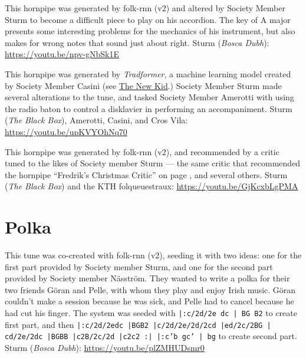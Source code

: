 \documentclass[a4paper,notitlepage,twoside]{book}
\begin{document}
\clearpage
{}
{}  
  
\hypertarget{hornpipe:DogintheBog}{}
This hornpipe was generated by folk-rnn (v2) and
altered by Society Member Sturm to become a difficult piece to play
on his accordion.
The key of A major presents some interesting problems for the mechanics
of his instrument, but also makes for wrong notes that sound just about right.
Sturm ({\em Bosca Dubh}): \url{https://youtu.be/npv-gNbSk1E}

\clearpage
{}
{}  
  
\hypertarget{hornpipe:RadioBatonHornpipe}{}
This hornpipe was generated by {\em Tradformer}, 
a machine learning model created by Society Member Casini
(see \hyperlink{jig:NewKid}{The New Kid}.)
Society Member Sturm made several alterations to the tune,
and tasked Society Member Amerotti with using the radio baton
to control a disklavier in performing an accompaniment.
Sturm ({\em The Black Box}), Amerotti, Casini, and Cros Vila: \url{https://youtu.be/upKVYOhNq70}

{}  
  
\hypertarget{hornpipe:TidforJul}{}
This hornpipe was generated by folk-rnn (v2), 
and recommended by a critic tuned to the likes of 
Society member Sturm --- the same critic that recommended
the hornpipe ``Fredrik's Christmas Critic'' on page \pageref{hornpipe:FredriksChristmasCritic},
and several others.
Sturm ({\em The Black Box}) and the KTH folqueuestraux: \url{https://youtu.be/GjKcxbLgPMA}



\clearpage
\section{Polka}
{}  
 
\hypertarget{polka:GoranPelle}{}
This tune was co-created with folk-rnn (v2), seeding it with two ideas: 
one for the first part provided by Society member Sturm, 
and one for the second part provided by Society member Näsström. 
They wanted to write a polka for their two friends Göran and Pelle, 
with whom they play and enjoy Irish music. 
Göran couldn't make a session because he was sick, 
and Pelle had to cancel because he had cut his finger.
The system was seeded with {\tt |:c/2d/2e dc | BG B2} to create first part,
and then 
{\tt |:c/2d/2edc |BGB2 |c/2d/2e/2d/2cd |ed/2c/2BG | cd/2e/2dc |BGBB |c2B/2c/2d |c2c2 :| |:c'b gc' | bg}
to create second part.
Sturm ({\em Bosca Dubh}): \url{https://youtu.be/plZMHUDsmr0}
\end{document}
